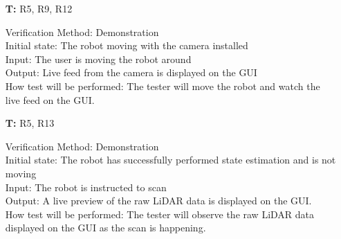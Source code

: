 \documentclass[12pt, titlepage]{article}
\newcounter{tnum} %
\begin{document}
\begin{itemize}
\item[\textbf{T\refstepcounter{tnum}\thetnum:}]{R5, R9, R12\\}

Verification Method: Demonstration\\
Initial state: The robot moving with the camera installed \\
Input: The user is moving the robot around \\
Output: Live feed from the camera is displayed on the GUI \\
How test will be performed: The tester will move the robot and watch the live feed on the GUI.\\

\item[\textbf{T\refstepcounter{tnum}\thetnum:}]{R5, R13\\}

Verification Method: Demonstration\\
Initial state: The robot has successfully performed state estimation and is not moving\\
Input: The robot is instructed to scan \\
Output: A live preview of the raw LiDAR data is displayed on the GUI.\\
How test will be performed: The tester will observe the raw LiDAR data displayed on the GUI as the scan is happening.\\


\end{itemize}
\end{document}
